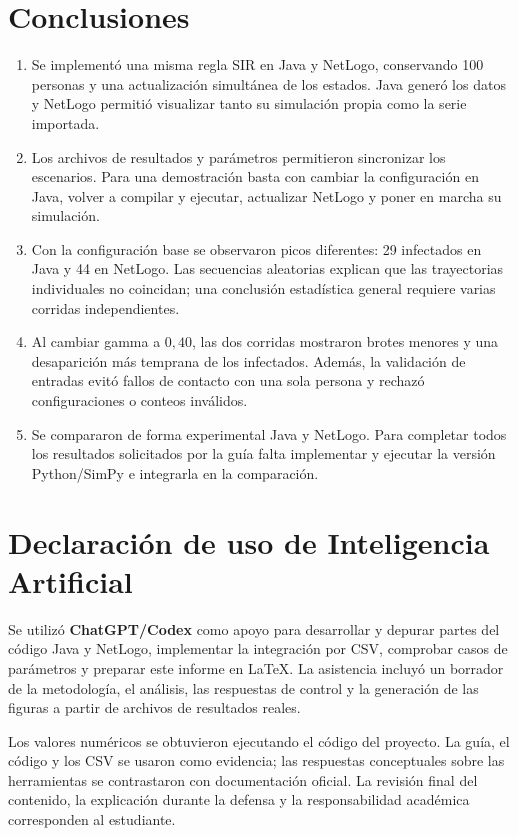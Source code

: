 \documentclass[11pt,a4paper]{article}
\begin{document}
\section{Conclusiones}
\begin{enumerate}
  \item Se implementó una misma regla SIR en Java y NetLogo, conservando 100 personas y una actualización simultánea de los estados. Java generó los datos y NetLogo permitió visualizar tanto su simulación propia como la serie importada.
  \item Los archivos de resultados y parámetros permitieron sincronizar los escenarios. Para una demostración basta con cambiar la configuración en Java, volver a compilar y ejecutar, actualizar NetLogo y poner en marcha su simulación.
  \item Con la configuración base se observaron picos diferentes: 29 infectados en Java y 44 en NetLogo. Las secuencias aleatorias explican que las trayectorias individuales no coincidan; una conclusión estadística general requiere varias corridas independientes.
  \item Al cambiar gamma a $0{,}40$, las dos corridas mostraron brotes menores y una desaparición más temprana de los infectados. Además, la validación de entradas evitó fallos de contacto con una sola persona y rechazó configuraciones o conteos inválidos.
  \item Se compararon de forma experimental Java y NetLogo. Para completar todos los resultados solicitados por la guía falta implementar y ejecutar la versión Python/SimPy e integrarla en la comparación.
\end{enumerate}

\section{Declaración de uso de Inteligencia Artificial}
Se utilizó \textbf{ChatGPT/Codex} como apoyo para desarrollar y depurar partes del código Java y NetLogo, implementar la integración por CSV, comprobar casos de parámetros y preparar este informe en \LaTeX{}. La asistencia incluyó un borrador de la metodología, el análisis, las respuestas de control y la generación de las figuras a partir de archivos de resultados reales.

Los valores numéricos se obtuvieron ejecutando el código del proyecto. La guía, el código y los CSV se usaron como evidencia; las respuestas conceptuales sobre las herramientas se contrastaron con documentación oficial. La revisión final del contenido, la explicación durante la defensa y la responsabilidad académica corresponden al estudiante.
\end{document}
